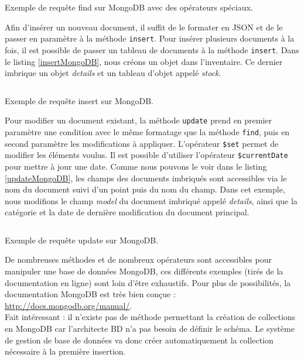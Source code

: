 	\begin{listing}[H]
		\inputminted{javascript}{code/requeteMongoFindOperator.js}
		\caption{Exemple de requête find sur MongoDB avec des opérateurs spéciaux.}
		\label{findOperatorMongoDB}
	\end{listing}

	Afin d'insérer un nouveau document, il suffit de le formater en JSON et de le passer en paramètre à la méthode \verb|insert|. Pour insérer plusieurs documents à la fois, il est possible de passer un tableau de documents à la méthode \verb|insert|. Dans le listing \ref{insertMongoDB}, nous créons un objet dans l'inventaire. Ce dernier imbrique un objet \textit{details} et un tableau d'objet appelé \textit{stock}.

	\begin{listing}[H]
		\inputminted{javascript}{code/requeteMongoInsert.js}
		\caption{Exemple de requête insert sur MongoDB.}
		\label{insertMongoDB}
	\end{listing}

	Pour modifier un document existant, la méthode \verb|update| prend en premier paramètre une condition avec le même formatage que la méthode \verb|find|, puis en second paramètre les modifications à appliquer. L'opérateur \verb|$set| permet de modifier les éléments voulus. Il est possible d'utiliser l'opérateur \verb|$currentDate| pour mettre à jour une date. Comme nous pouvons le voir dans le listing \ref{updateMongoDB}, les champs des documents imbriqués sont accessibles via le nom du document suivi d'un point puis du nom du champ. Dans cet exemple, nous modifions le champ \textit{model} du document imbriqué appelé \textit{details}, ainsi que la catégorie et la date de dernière modification du document principal.

	\begin{listing}[H]
		\inputminted{javascript}{code/requeteMongoUpdate.js}
		\caption{Exemple de requête update sur MongoDB.}
		\label{updateMongoDB}
	\end{listing}

	De nombreuses méthodes et de nombreux opérateurs sont accessibles pour manipuler une base de données MongoDB, ces différents exemples (tirés de la documentation en ligne) sont loin d'être exhaustifs. Pour plus de possibilités, la documentation MongoDB est très bien conçue : \url{http://docs.mongodb.org/manual/}.\\

	Fait intéressant : il n'existe pas de méthode permettant la création de collections en MongoDB car l'architecte BD n'a pas besoin de définir le schéma. Le système de gestion de base de données va donc créer automatiquement la collection nécessaire à la première insertion.

